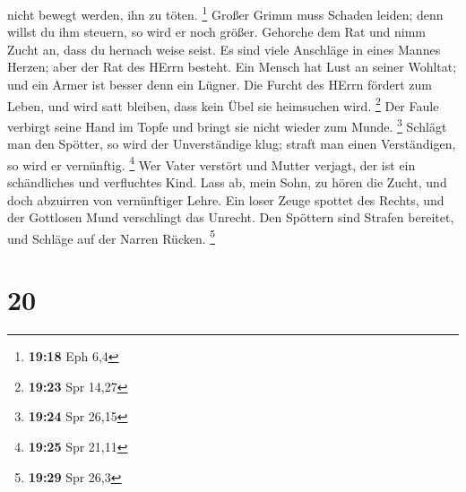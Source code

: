 nicht bewegt werden, ihn zu töten. \footnote{\textbf{19:18} Eph 6,4}
 Großer Grimm muss Schaden leiden; denn willst du ihm
steuern, so wird er noch größer.  Gehorche dem Rat und
nimm Zucht an, dass du hernach weise seist.  Es sind
viele Anschläge in eines Mannes Herzen; aber der Rat des HErrn besteht.
 Ein Mensch hat Lust an seiner Wohltat; und ein Armer ist
besser denn ein Lügner.  Die Furcht des HErrn fördert zum
Leben, und wird satt bleiben, dass kein Übel sie heimsuchen wird.
\footnote{\textbf{19:23} Spr 14,27}  Der Faule verbirgt
seine Hand im Topfe und bringt sie nicht wieder zum Munde. \footnote{\textbf{19:24}
  Spr 26,15}  Schlägt man den Spötter, so wird der
Unverständige klug; straft man einen Verständigen, so wird er
vernünftig. \footnote{\textbf{19:25} Spr 21,11}  Wer
Vater verstört und Mutter verjagt, der ist ein schändliches und
verfluchtes Kind.  Lass ab, mein Sohn, zu hören die
Zucht, und doch abzuirren von vernünftiger Lehre.  Ein
loser Zeuge spottet des Rechts, und der Gottlosen Mund verschlingt das
Unrecht.  Den Spöttern sind Strafen bereitet, und Schläge
auf der Narren Rücken. \footnote{\textbf{19:29} Spr 26,3}

\hypertarget{section-19}{%
\section{20}\label{section-19}}

